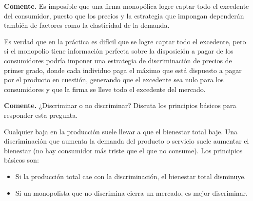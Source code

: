 \question \textbf{Comente.} Es imposible que una firma monopólica logre captar todo el excedente del consumidor, puesto que los precios y la estrategia que impongan dependerán también de factores como la elasticidad de la demanda.
\begin{solution}
Es verdad que en la práctica es difícil que se logre captar todo el excedente, pero si el monopolio tiene información perfecta sobre la disposición a pagar de los consumidores podría imponer una estrategia de discriminación de precios de primer grado, donde cada individuo paga el máximo que está dispuesto a pagar por el producto en cuestión, generando que el excedente sea nulo para los consumidores y que la firma se lleve todo el excedente del mercado.

\end{solution}

\question \textbf{Comente.} ¿Discriminar o no discriminar? Discuta los principios básicos para responder esta pregunta.
\begin{solution}
Cualquier baja en la producción suele llevar a que el bienestar total baje. Una discriminación que aumenta la demanda del producto o servicio suele aumentar el bienestar (no hay consumidor más triste que el que no consume). Los principios básicos son:
\begin{itemize}
  \item Si la producción total cae con la discriminación, el bienestar total disminuye.
  \item Si un monopolista que no discrimina cierra un mercado, es mejor discriminar.
\end{itemize}

\end{solution}

